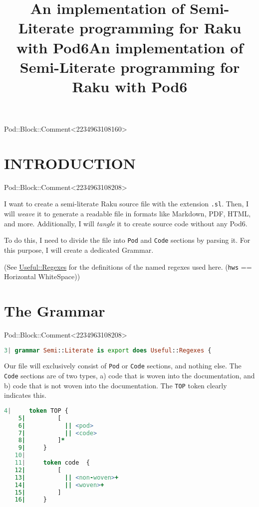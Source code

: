 \documentclass{scrartcl}
\title{An implementation of Semi-Literate programming for Raku with Pod6}
\begin{document}
\maketitle
Pod::Block::Comment<2234963108160>

\title{An implementation of Semi-Literate programming for Raku with Pod6}

\section{INTRODUCTION}

Pod::Block::Comment<2234963108208>

I want to create a semi-literate Raku source file with the extension
\texttt{.sl}. Then, I will \textit{weave} it to generate a readable file in
formats like Markdown, PDF, HTML, and more. Additionally, I will
\textit{tangle} it to create source code without any Pod6.

To do this, I need to divide the file into \texttt{Pod} and \texttt{Code}
sections by parsing it. For this purpose, I will create a dedicated
Grammar.

(See \href{https://github.com/deoac/Useful-Regexes}{Useful::Regexes} for
the definitions of the named regexes used here. (\texttt{hws} == Horizontal
WhiteSpace))

\section{The Grammar}

Pod::Block::Comment<2234963108208>

\begin{lstlisting}[language=Raku]
    3| grammar Semi::Literate is export does Useful::Regexes {

\end{lstlisting}


Our file will exclusively consist of \texttt{Pod} or \texttt{Code}
sections, and nothing else. The \texttt{Code} sections are of two types, a)
code that is woven into the documentation, and b) code that is not woven
into the documentation. The \texttt{TOP} token clearly indicates this.

\begin{lstlisting}[language=Raku]
    4|     token TOP {
    5|         [
    6|           || <pod>
    7|           || <code>
    8|         ]*
    9|     } 
   10| 
   11|     token code  {
   12|         [
   13|           || <non-woven>+
   14|           || <woven>+
   15|         ]
   16|     } 

\end{lstlisting}
\end{document}
